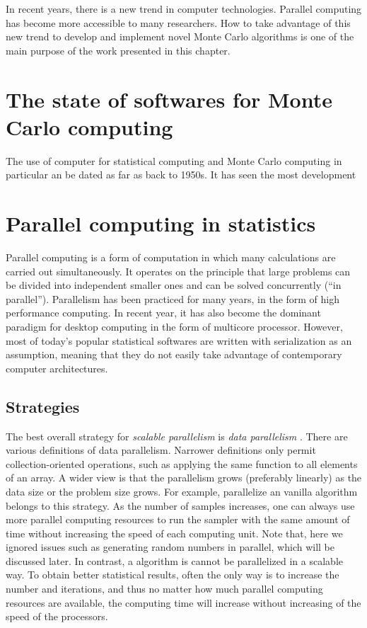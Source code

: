 In recent years, there is a new trend in computer technologies. Parallel
computing has become more accessible to many researchers. How to take
advantage of this new trend to develop and implement novel Monte Carlo
algorithms is one of the main purpose of the work presented in this chapter.

\section{The state of softwares for Monte Carlo computing}
\label{sec:The state of software for Monte Carlo computing}

The use of computer for statistical computing and Monte Carlo computing in
particular an be dated as far as back to 1950s. It has seen the most
development

\section{Parallel computing in statistics}
\label{sec:Parallel computing in statistics}

Parallel computing is a form of computation in which many calculations are
carried out simultaneously. It operates on the principle that large problems
can be divided into independent smaller ones and can be solved concurrently
(``in parallel''). Parallelism has been practiced for many years, in the form
of high performance computing. In recent year, it has also become the dominant
paradigm for desktop computing in the form of multicore processor. However,
most of today's popular statistical softwares are written with serialization
as an assumption, meaning that they do not easily take advantage of
contemporary computer architectures.

\subsection{Strategies}
\label{sub:Strategies}

The best overall strategy for \emph{scalable parallelism} is \emph{data
  parallelism} \cite{datapar}. There are various definitions of data
parallelism. Narrower definitions only permit collection-oriented operations,
such as applying the same function to all elements of an array. A wider view
is that the parallelism grows (preferably linearly) as the data size or the
problem size grows. For example, parallelize an vanilla algorithm belongs to
this strategy. As the number of samples increases, one can always use more
parallel computing resources to run the sampler with the same amount of time
without increasing the speed of each computing unit. Note that, here we
ignored issues such as generating random numbers in parallel, which will be
discussed later. In contrast, a \mcmc algorithm is cannot be parallelized in a
scalable way. To obtain better statistical results, often the only way is to
increase the number and iterations, and thus no matter how much parallel
computing resources are available, the computing time will increase without
increasing of the speed of the processors.

